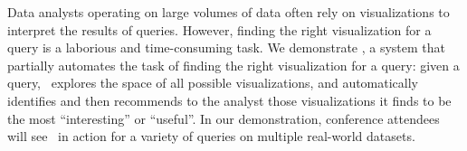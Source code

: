 

% 
Data analysts operating on large volumes of data 
often rely on visualizations to interpret the results of queries. 
However, finding the right visualization for a query is 
a laborious and time-consuming task. 
We demonstrate \SeeDB, a system that partially automates 
the task of finding the right visualization for a query: 
given a query, \SeeDB\ explores the space of all possible visualizations,
and automatically identifies and then recommends to the analyst
those visualizations it finds to be the most ``interesting'' or ``useful''. 
In our demonstration, conference attendees
will see \SeeDB\ in action for a variety of queries on multiple real-world
datasets.





